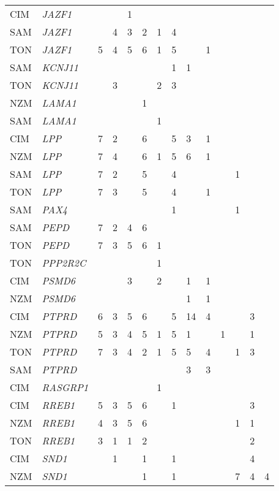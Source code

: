 \documentclass[twoside,openright]{report}
\begin{document}
\begin{ThreePartTable}
\begin{longtable}[t]{llllllllllllll}
CIM & \em{JAZF1} &  &  & 1 &  &  &  &  &  &  &  &  & \\
SAM & \em{JAZF1} &  & 4 & 3 & 2 & 1 & 4 &  &  &  &  &  & \\
TON & \em{JAZF1} & 5 & 4 & 5 & 6 & 1 & 5 &  & 1 &  &  &  & \\
SAM & \em{KCNJ11} &  &  &  &  &  & 1 & 1 &  &  &  &  & \\
TON & \em{KCNJ11} &  & 3 &  &  & 2 & 3 &  &  &  &  &  & \\
NZM & \em{LAMA1} &  &  &  & 1 &  &  &  &  &  &  &  & \\
SAM & \em{LAMA1} &  &  &  &  & 1 &  &  &  &  &  &  & \\
CIM & \em{LPP} & 7 & 2 &  & 6 &  & 5 & 3 & 1 &  &  &  & \\
NZM & \em{LPP} & 7 & 4 &  & 6 & 1 & 5 & 6 & 1 &  &  &  & \\
SAM & \em{LPP} & 7 & 2 &  & 5 &  & 4 &  &  &  & 1 &  & \\
TON & \em{LPP} & 7 & 3 &  & 5 &  & 4 &  & 1 &  &  &  & \\
SAM & \em{PAX4} &  &  &  &  &  & 1 &  &  &  & 1 &  & \\
SAM & \em{PEPD} & 7 & 2 & 4 & 6 &  &  &  &  &  &  &  & \\
TON & \em{PEPD} & 7 & 3 & 5 & 6 & 1 &  &  &  &  &  &  & \\
TON & \em{PPP2R2C} &  &  &  &  & 1 &  &  &  &  &  &  & \\
CIM & \em{PSMD6} &  &  & 3 &  & 2 &  & 1 & 1 &  &  &  & \\
NZM & \em{PSMD6} &  &  &  &  &  &  & 1 & 1 &  &  &  & \\
CIM & \em{PTPRD} & 6 & 3 & 5 & 6 &  & 5 & 14 & 4 &  &  & 3 & \\
NZM & \em{PTPRD} & 5 & 3 & 4 & 5 & 1 & 5 & 1 &  & 1 &  & 1 & \\
TON & \em{PTPRD} & 7 & 3 & 4 & 2 & 1 & 5 & 5 & 4 &  & 1 & 3 & \\
SAM & \em{PTPRD} &  &  &  &  &  &  & 3 & 3 &  &  &  & \\
CIM & \em{RASGRP1} &  &  &  &  & 1 &  &  &  &  &  &  & \\
CIM & \em{RREB1} & 5 & 3 & 5 & 6 &  & 1 &  &  &  &  & 3 & \\
NZM & \em{RREB1} & 4 & 3 & 5 & 6 &  &  &  &  &  & 1 & 1 & \\
TON & \em{RREB1} & 3 & 1 & 1 & 2 &  &  &  &  &  &  & 2 & \\
CIM & \em{SND1} &  & 1 &  & 1 &  & 1 &  &  &  &  & 4 & \\
NZM & \em{SND1} &  &  &  & 1 &  & 1 &  &  &  & 7 & 4 & 4\\

\end{longtable}
\end{ThreePartTable}
\end{document}
